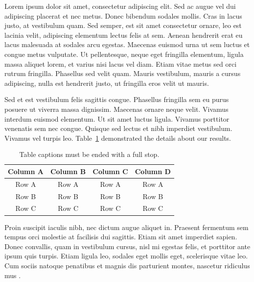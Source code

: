 Lorem ipsum dolor sit amet, consectetur adipiscing elit. Sed ac augue vel dui 
adipiscing placerat et nec metus. Donec bibendum sodales mollis. Cras in lacus 
justo, at vestibulum quam. Sed semper, est sit amet consectetur ornare, leo est 
lacinia velit, adipiscing elementum lectus felis at sem. Aenean hendrerit erat eu 
lacus malesuada at sodales arcu egestas. Maecenas euismod urna ut sem luctus et 
congue metus vulputate. Ut pellentesque, neque eget fringilla elementum, ligula 
massa aliquet lorem, et varius nisi lacus vel diam. Etiam vitae metus sed orci 
rutrum fringilla. Phasellus sed velit quam. Mauris vestibulum, mauris a cursus 
adipiscing, nulla est hendrerit justo, ut fringilla eros velit ut mauris.

Sed et est vestibulum felis sagittis congue. Phasellus fringilla sem eu purus 
posuere ut viverra massa dignissim. Maecenas ornare neque velit. Vivamus interdum euismod elementum. Ut sit amet luctus ligula. Vivamus porttitor venenatis sem nec congue. Quisque sed lectus et nibh imperdiet vestibulum. Vivamus vel turpis leo. Table~\ref{table_ex2} demonstrated the details about our results.  

\begin{table}[!ht]
{\setlength{\tabcolsep}{14pt}
\caption{Table captions must be ended with a full stop.}
\begin{center}
\vspace{-6mm}
\begin{tabular}{cccc}
\hline\hline
Column A & Column B & Column C & Column D \\
\hline
Row A & Row A & Row A & Row A \\
Row B & Row B & Row B & Row B \\
Row C & Row C & Row C & Row C \\
\hline
\end{tabular}
\vspace{-6mm}
\end{center}
\label{table_ex2}}
\end{table}

Proin suscipit iaculis nibh, nec dictum augue aliquet in. Praesent fermentum sem 
tempus orci molestie at facilisis dui sagittis. Etiam sit amet imperdiet sapien. 
Donec convallis, quam in vestibulum cursus, nisl mi egestas felis, et porttitor 
ante ipsum quis turpis. Etiam ligula leo, sodales eget mollis eget, scelerisque 
vitae leo. Cum sociis natoque penatibus et magnis dis parturient montes, nascetur 
ridiculus mus \cite{Zuckerman199486}. 
